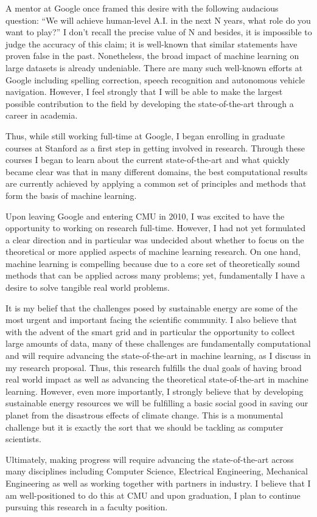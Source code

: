 \documentclass[12pt]{article}
\begin{document}
A mentor at Google once framed this desire with the following audacious question: ``We will achieve human-level A.I. in the next N years, what role do you want to play?'' I don't recall the precise value of N  and besides, it is impossible to judge the accuracy of this claim; it is well-known that similar statements have proven false in the past. Nonetheless, the broad impact of machine learning on large datasets is already undeniable. There are many such well-known efforts at Google including spelling correction, speech recognition and autonomous vehicle navigation. However, I feel strongly that I will be able to make the largest possible contribution to the field by developing the state-of-the-art through a career in academia.

Thus, while still working full-time at Google, I began enrolling in graduate courses at Stanford as a first step in getting involved in research. Through these courses I began to learn about the current state-of-the-art and what quickly became clear was that in many different domains, the best computational results are currently achieved by applying a common set of principles and methods that form the basis of machine learning.

Upon leaving Google and entering CMU in 2010, I was excited to have the opportunity to working on research full-time. However, I had not yet formulated a clear direction and in particular was undecided about whether to focus on the theoretical or more applied aspects of machine learning research. On one hand, machine learning is compelling because due to a core set of theoretically sound methods that can be applied across many problems; yet, fundamentally I have a desire to solve tangible real world problems. 

It is my belief that the challenges posed by sustainable energy are some of the most urgent and important facing the scientific community. I also believe that with the advent of the smart grid and in particular the opportunity to collect large amounts of data, many of these challenges are fundamentally computational and will require advancing the state-of-the-art in machine learning, as I discuss in my research proposal. Thus, this research fulfills the dual goals of having broad real world impact as well as advancing the theoretical state-of-the-art in machine learning. However, even more importantly, I strongly believe that by developing sustainable energy resources we will be fulfilling a basic social good in saving our planet from the disastrous effects of climate change. This is a monumental challenge but it is exactly the sort that we should be tackling as computer scientists.

Ultimately, making progress will require advancing the state-of-the-art across many disciplines including Computer Science, Electrical Engineering, Mechanical Engineering as well as working together with partners in industry. I believe that I am well-positioned to do this at CMU and upon graduation, I plan to continue pursuing this research in a faculty position.

\renewcommand{\refname}{\vskip -1.5cm}
\footnotesize


\end{document}
